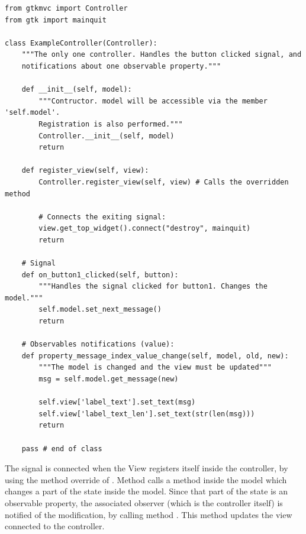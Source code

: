 { \codesize 
\begin{verbatim} 
from gtkmvc import Controller
from gtk import mainquit

class ExampleController(Controller):
    """The only one controller. Handles the button clicked signal, and
    notifications about one observable property."""

    def __init__(self, model):
        """Contructor. model will be accessible via the member 'self.model'.
        Registration is also performed."""
        Controller.__init__(self, model)
        return

    def register_view(self, view):
        Controller.register_view(self, view) # Calls the overridden method

        # Connects the exiting signal:
        view.get_top_widget().connect("destroy", mainquit)
        return

    # Signal
    def on_button1_clicked(self, button):
        """Handles the signal clicked for button1. Changes the model."""
        self.model.set_next_message()
        return

    # Observables notifications (value):
    def property_message_index_value_change(self, model, old, new):
        """The model is changed and the view must be updated"""
        msg = self.model.get_message(new)
        
        self.view['label_text'].set_text(msg)
        self.view['label_text_len'].set_text(str(len(msg)))
        return    

    pass # end of class
\end{verbatim}
}

The  signal is connected when the View registers
itself inside the controller, by using the method override of
.  Method 
calls a method inside the model which changes a part of the state
inside the model. Since that part of the state is an observable
property, the associated observer (which is the controller itself) is
notified of the modification, by calling method
. This method
updates the view connected to the controller.

